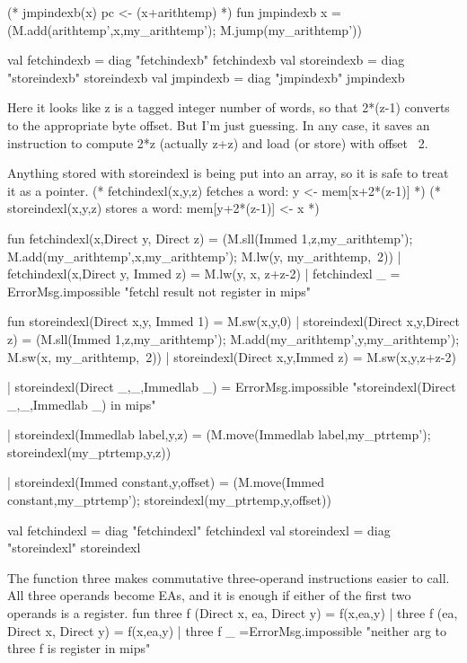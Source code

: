 (* jmpindexb(x)    pc <- (x+arithtemp) *)
fun jmpindexb x = (M.add(arithtemp',x,my_arithtemp');
                     M.jump(my_arithtemp'))

\endcode
{}
\endmoddef
val fetchindexb = diag "fetchindexb" fetchindexb
val storeindexb = diag "storeindexb" storeindexb
val jmpindexb = diag "jmpindexb" jmpindexb


\endcode
{}
Here it looks like \code{}z\edoc{} is a tagged integer number of words,
so that \code{}2*(z-1)\edoc{} converts to the appropriate byte offset.
But I'm just guessing.
In any case, it saves an instruction to compute \code{}2*z\edoc{} (actually \code{}z+z\edoc{})
and 
load (or store) with offset \code{}~2\edoc{}.

Anything stored with \code{}storeindexl\edoc{} is being put into an array, so it
is safe to treat it as a pointer. 
\enddocs
{}
\endmoddef
   (* fetchindexl(x,y,z) fetches a word:   y <- mem[x+2*(z-1)] *)
   (* storeindexl(x,y,z) stores a word:    mem[y+2*(z-1)] <- x *)

fun fetchindexl(x,Direct y, Direct z) = 
      (M.sll(Immed 1,z,my_arithtemp');
       M.add(my_arithtemp',x,my_arithtemp');
       M.lw(y, my_arithtemp,~2))
  | fetchindexl(x,Direct y, Immed z) = M.lw(y, x, z+z-2)
  | fetchindexl _ = ErrorMsg.impossible "fetchl result not register in mips"

fun storeindexl(Direct x,y, Immed 1) = M.sw(x,y,0)
  | storeindexl(Direct x,y,Direct z) = 
    (M.sll(Immed 1,z,my_arithtemp');
     M.add(my_arithtemp',y,my_arithtemp');
     M.sw(x, my_arithtemp,~2))
  | storeindexl(Direct x,y,Immed z) = M.sw(x,y,z+z-2)

  | storeindexl(Direct _,_,Immedlab _) =
        ErrorMsg.impossible "storeindexl(Direct _,_,Immedlab _) in mips"

  | storeindexl(Immedlab label,y,z) =
    (M.move(Immedlab label,my_ptrtemp');
     storeindexl(my_ptrtemp,y,z))

  | storeindexl(Immed constant,y,offset) =
        (M.move(Immed constant,my_ptrtemp');
         storeindexl(my_ptrtemp,y,offset))

\endcode
{}
\endmoddef
val fetchindexl = diag "fetchindexl" fetchindexl
val storeindexl = diag "storeindexl" storeindexl


\endcode
{}
The function \code{}three\edoc{} makes commutative three-operand
instructions easier to call.
All three operands become \code{}EA\edoc{}s, and it is enough if either of the
first two operands is a register.
\enddocs
{}
\endmoddef
fun three f (Direct x, ea, Direct y) = f(x,ea,y)
  | three f (ea, Direct x, Direct y) = f(x,ea,y)
  | three f _ =ErrorMsg.impossible "neither arg to three f is register in mips"

